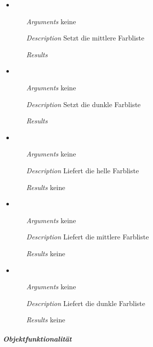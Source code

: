 \begin{itemize}
\item {}
\begin{enumerate}
\item[\textit{Arguments}] keine
\item[\textit{Description}] Setzt die 
mittlere Farbliste
\item[\textit{Results}] 
\end{enumerate}

\item {}
\begin{enumerate}
\item[\textit{Arguments}] keine
\item[\textit{Description}] Setzt die 
dunkle Farbliste
\item[\textit{Results}] 
\end{enumerate}

\item {}
\begin{enumerate}
\item[\textit{Arguments}] keine
\item[\textit{Description}] Liefert die helle 
Farbliste
\item[\textit{Results}] keine
\end{enumerate}

\item {} 
\begin{enumerate}
\item[\textit{Arguments}] keine
\item[\textit{Description}] Liefert die mittlere
Farbliste
\item[\textit{Results}] keine
\end{enumerate}

\item {}
\begin{enumerate}
\item[\textit{Arguments}] keine
\item[\textit{Description}] Liefert die dunkle
Farbliste
\item[\textit{Results}] keine
\end{enumerate}

\end{itemize}

\newpage

\subparagraph{Objektfunktionalit\"at}


